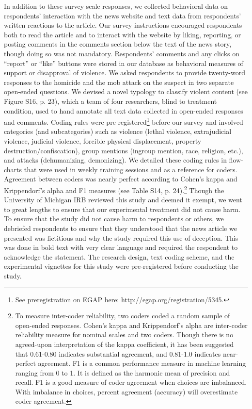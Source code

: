 In addition to these survey scale responses, we collected behavioral data on respondents' interaction with the news website and text data from respondents' written reactions to the article. Our survey instructions encouraged respondents both to read the article and to interact with the website by liking, reporting, or posting comments in the comments section below the text of the news story, though doing so was not mandatory. Respondents' comments and any clicks on ``report'' or ``like'' buttons were stored in our database as behavioral measures of support or disapproval of violence. We asked respondents to provide twenty-word responses to the homicide and the mob attack on the suspect in two separate open-ended questions. We devised a novel typology to classify violent content (see Figure S16, p. 23), which a team of four researchers, blind to treatment condition, used to hand annotate all text data collected in open-ended responses and comments. Coding rules were pre-registered\footnote{See preregistration on EGAP here: http://egap.org/registration/5345.} before our survey and involved categories (and subcategories) such as violence (lethal violence, extrajudicial violence, judicial violence, forcible physical displacement, property destruction/confiscation), group mentions (ingroup mention, race, religion, etc.), and attacks (dehumanizing, demonizing). We detailed these coding rules in flow-charts that were used in weekly training sessions and as a reference for coders. Agreement between coders was nearly perfect according to Cohen's kappa and Krippendorf's alpha and F1 measures (see Table S14, p. 24).\footnote{To measure inter-coder reliability, two coders coded a random sample of open-ended responses. Cohen's kappa and Krippendorf's alpha are inter-coder reliability measure for nominal scales and two coders. Though there is no agreed-upon interpretation of the kappa coefficient, it has been  suggested  that 0.61-0.80 indicates substantial  agreement, and 0.81-1.0 indicates near-perfect agreement. F1 is a common performance measure in machine learning ranging from 0 to 1. It is defined as the harmonic mean of precision and recall. F1 is a good measure of coder agreement when choices are imbalanced. With imbalance in choices, percent agreement (accuracy) will overestimate coder agreement.} Though the University of Michigan IRB reviewed this study and deemed it exempt, we went to great lengths to ensure that our experimental treatment did not cause harm. To ensure that the study did not cause harm to respondents or others, we debriefed respondents to ensure that they understood that the news article we presented was fictitious and why the study required this use of deception. This was done in bold text with very clear language and required the respondent to acknowledge the statement. The research design, text coding scheme, and the experimental vignettes for this study were pre-registered before conducting the study.

